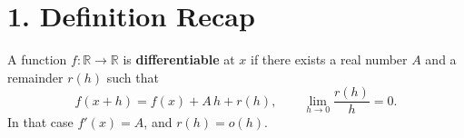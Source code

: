 \documentclass[11pt,openany]{article}
\renewcommand{\emph}[1]{\textbf{#1}}
\begin{document}
%	
%		
%		
%		
%		
%		
%		
\section*{1. Definition Recap}

A function \(f:\mathbb{R}\to\mathbb{R}\) is \emph{differentiable} at \(x\) if there exists a real number \(A\) and a remainder \(r(h)\) such that
\[
f(x+h) = f(x) + A\,h + r(h),
\qquad
\lim_{h\to0}\frac{r(h)}{h} = 0.
\]
In that case \(f'(x)=A\), and \(r(h)=o(h)\).
\end{document}
